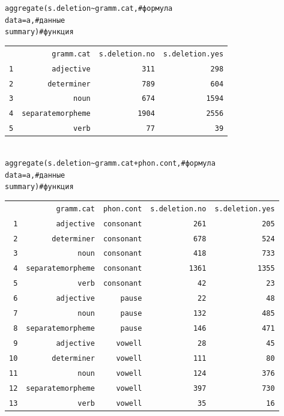 \begin{frame}
\scriptsize
\begin{alltt}
\alert{aggregate(s.deletion\textasciitilde gramm.cat, \hfill \# формула\\
data = a, \hfill \# данные\\
summary)\hfill \# функция\\}
\begin{tabular}{rrrr}
\multicolumn{1}{l}{} & gramm.cat & \multicolumn{1}{l}{s.deletion.no} & \multicolumn{1}{l}{s.deletion.yes} \\ 
1 & adjective & 311 & 298 \\ 
2 & determiner & 789 & 604 \\ 
3 & noun & 674 & 1594 \\ 
4 & separate morpheme & 1904 & 2556 \\ 
5 & verb & 77 & 39 \\ 
\end{tabular}
\\
\alert{aggregate(s.deletion\textasciitilde gramm.cat + phon.cont, \hfill \# формула\\
data = a, \hfill \# данные\\
summary)\hfill \# функция\\}
\begin{tabular}{rrrrr}
 & gramm.cat & phon.cont & s.deletion.no & s.deletion.yes \\
1 & adjective & consonant & 261 & 205\\ 
2 & determiner & consonant & 678 & 524 \\ 
3 & noun & consonant & 418 & 733 \\ 
4 & separate morpheme & consonant & 1361 & 1355 \\ 
5 & verb & consonant & 42 & 23 \\ 
6 & adjective & pause & 22 & 48 \\ 
7 & noun & pause & 132 & 485 \\ 
8 & separate morpheme & pause & 146 & 471 \\ 
9 & adjective & vowell & 28 & 45 \\ 
10 & determiner & vowell & 111 & 80 \\ 
11 & noun & vowell & 124 & 376 \\ 
12 & separate morpheme & vowell & 397 & 730 \\ 
13 & verb & vowell & 35 & 16 \\ 
\end{tabular}
\end{alltt}
\normalsize
\end{frame}
